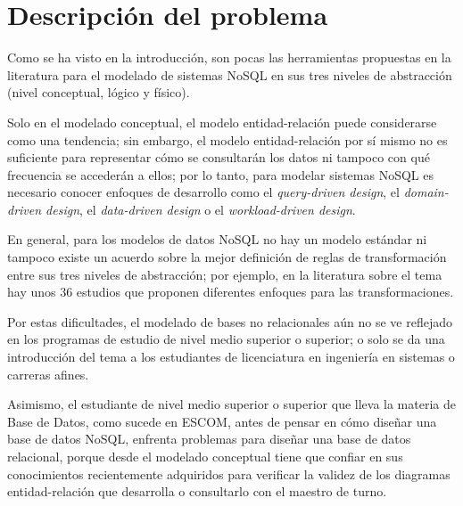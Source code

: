 \section{Descripción del problema}
Como se ha visto en la introducción, son pocas las herramientas propuestas en la literatura para el modelado de sistemas NoSQL en sus tres niveles de abstracción (nivel conceptual, lógico y físico).


Solo en el modelado conceptual, el modelo entidad-relación puede considerarse como una tendencia; sin embargo, el modelo entidad-relación por sí mismo no es suficiente para representar cómo se consultarán los datos ni tampoco con qué frecuencia se accederán a ellos; por lo tanto, para modelar sistemas NoSQL es necesario conocer enfoques de desarrollo como el \textit{query-driven design}, el \textit{domain-driven design}, el \textit{data-driven design} o el \textit{workload-driven design}.


En general, para los modelos de datos NoSQL no hay un modelo estándar ni tampoco existe un acuerdo sobre la mejor definición de reglas de transformación entre sus tres niveles de abstracción; por ejemplo, en la literatura sobre el tema hay unos 36 estudios\cite{martinez-mosquera_modeling_2020} que proponen diferentes enfoques para las transformaciones.


Por estas dificultades, el modelado de bases no relacionales aún no se ve reflejado en los programas de estudio de nivel medio superior o superior; o solo se da una introducción del tema a los estudiantes de licenciatura en ingeniería en sistemas o carreras afines.


Asimismo, el estudiante de nivel medio superior o superior que lleva la materia de Base de Datos, como sucede en ESCOM, antes de pensar en cómo diseñar una base de datos NoSQL, enfrenta problemas para diseñar una base de datos relacional, porque desde el modelado conceptual tiene que confiar en sus conocimientos recientemente adquiridos para verificar la validez de los diagramas entidad-relación que desarrolla o consultarlo con el maestro de turno.


